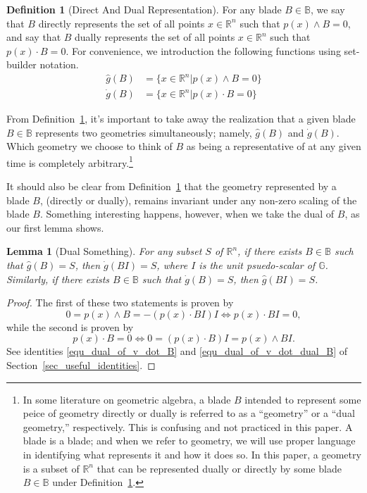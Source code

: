 \documentclass{birkjour}
\newtheorem{lem}[thm]{Lemma}
\theoremstyle{definition}
\newtheorem{defn}[thm]{Definition}
\theoremstyle{remark}
\numberwithin{equation}{section}
\newcommand{\R}{\mathbb{R}}
\newcommand{\B}{\mathbb{B}}
\newcommand{\G}{\mathbb{G}}
\newcommand{\gd}{\dot{g}}
\newcommand{\gh}{\hat{g}}
\begin{document}
\begin{defn}[Direct And Dual Representation]\label{def_blade_rep_geo}
For any blade $B\in\B$, we say that $B$ directly represents the set of all points $x\in\R^n$ such that
$p(x)\wedge B=0$, and say that $B$ dually represents the set of all points $x\in\R^n$ such that
$p(x)\cdot B=0$.  For convenience, we introduction the following functions using set-builder notation.
\begin{align*}
\gh(B) &= \{x\in\R^n|p(x)\wedge B=0\} \\
\gd(B) &= \{x\in\R^n|p(x)\cdot B=0\}
\end{align*}
\end{defn}
From Definition~\ref{def_blade_rep_geo}, it's important to take away the realization that a given blade $B\in\B$ represents two geometries
simultaneously; namely, $\gh(B)$ and $\gd(B)$.  Which geometry we choose to think of $B$ as being a representative of at any given time is completely
arbitrary.\footnote{In some literature on geometric algebra, a blade $B$ intended to represent some peice of geometry directly or dually
is referred to as a ``geometry'' or a ``dual geometry,'' respectively.  This is confusing and not practiced in this paper.  A blade is a blade; and when
we refer to geometry, we will use proper language in identifying what represents it and how it does so.  In this paper, a geometry is a subset of
$\R^n$ that can be represented dually or directly by some blade $B\in\B$ under Definition~\ref{def_blade_rep_geo}.}

It should also be clear from Definition~\ref{def_blade_rep_geo} that the geometry represented by a blade $B$, (directly or dually), remains invariant
under any non-zero scaling of the blade $B$.  Something interesting happens, however, when we take the dual of $B$, as our first lemma shows.

\begin{lem}[Dual Something]\label{lem_dual_rep}
For any subset $S$ of $\R^n$, if there exists $B\in\B$ such that $\gh(B)=S$, then $\gd(BI)=S$, where
$I$ is the unit psuedo-scalar of $\G$.  Similarly, if there exists $B\in\B$ such that $\gd(B)=S$, then $\gh(BI)=S$.
\end{lem}
\begin{proof}
The first of these two statements is proven by
\begin{equation*}
0=p(x)\wedge B=-(p(x)\cdot BI)I\iff p(x)\cdot BI=0,
\end{equation*}
while the second is proven by
\begin{equation*}
p(x)\cdot B=0\iff 0=(p(x)\cdot B)I=p(x)\wedge BI.
\end{equation*}
See identities \eqref{equ_dual_of_v_dot_B} and \eqref{equ_dual_of_v_dot_dual_B} of Section~\ref{sec_useful_identities}.
\end{proof}
\end{document}

